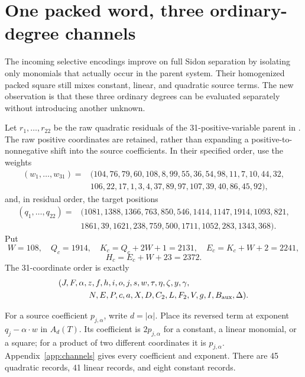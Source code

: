 \section{One packed word, three ordinary-degree channels}
\label{sec:channels}

The incoming selective encodings improve on full Sidon separation by
isolating only monomials that actually occur in the parent system.  Their
homogenized packed square still mixes constant, linear, and quadratic
source terms.  The new observation is that these three ordinary degrees
can be evaluated separately without introducing another unknown.

Let \(r_1,\ldots,r_{22}\) be the raw quadratic residuals of the
31-positive-variable parent in .
The raw positive coordinates are retained, rather than expanding a
positive-to-nonnegative shift into the source coefficients.  In their
specified order, use the weights
\[
\begin{split}
(w_1,\ldots,w_{31})={}&(104,76,79,60,108,8,99,55,36,54,98,11,7,10,44,32,\\
 &106,22,17,1,3,4,37,89,97,107,39,40,86,45,92),
\end{split}
\]
and, in residual order, the target positions
\[
\begin{split}
(q_1,\ldots,q_{22})={}&(1081,1388,1366,763,850,546,1414,1147,1914,1093,821,\\
 &1861,39,1621,238,759,500,1711,1052,283,1343,368).
\end{split}
\]
Put
\[
 W=108,\quad Q_c=1914,\quad K_c=Q_c+2W+1=2131,
 \quad E_c=K_c+W+2=2241,
\]
\[
 H_c=E_c+W+23=2372.
\]
The 31-coordinate order is exactly
\[
\begin{split}
&(J,F,\alpha,z,f,h,i,o,j,s,w,\tau,\eta,\zeta,y,\gamma,\\
&\hspace{13mm}N,E,P,c,a,X,D,C_2,L,F_2,V,g,I,B_{\rm aux},\Delta).
\end{split}
\]

For a source coefficient \(p_{j,\alpha}\), write \(d=|\alpha|\).
Place its reversed term at exponent \(q_j-\alpha\cdot w\) in
\(A_d(T)\).  Its coefficient is \(2p_{j,\alpha}\) for a constant,
a linear monomial, or a square; for a product of two different coordinates
it is \(p_{j,\alpha}\).  Appendix~\ref{app:channels} gives every
coefficient and exponent.  There are 45 quadratic records, 41 linear
records, and eight constant records.

